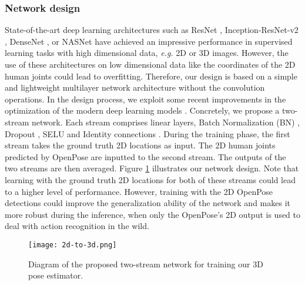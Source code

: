 \documentclass{bmvc2k}
\begin{document}
\subsubsection{Network design}
State-of-the-art deep learning architectures such as ResNet \cite{7780459}, Inception-ResNet-v2 \cite{Szegedy2016Inceptionv4IA}, DenseNet \cite{Huang2017DenselyCC}, or NASNet \cite{Zoph2017NeuralAS} have achieved an impressive performance in supervised learning tasks with high dimensional data, \textit{e.g.} 2D or 3D images. However, the use of these architectures \cite{7780459,Szegedy2016Inceptionv4IA,Huang2017DenselyCC,Zoph2017NeuralAS} on low dimensional data like the coordinates of the 2D human joints could lead to overfitting. Therefore, our design is based on a simple and lightweight multilayer network architecture without the convolution operations. In the design process, we exploit some recent improvements in the optimization of the modern deep learning models \cite{7780459,Huang2017DenselyCC}. Concretely, we propose a two-stream network. Each stream comprises linear layers, Batch Normalization (BN) \cite{Ioffe2015BatchNA}, Dropout \cite{Hinton2012ImprovingNN}, SELU \cite{Klambauer2017SelfNormalizingNN} and Identity connections \cite{7780459}. During the training phase, the first stream takes the  ground truth 2D locations as input. The 2D human joints predicted by OpenPose \cite{cao2017realtime} are inputted to the second stream. The outputs of the two streams are then averaged. Figure \ref{fig:2} illustrates our network design. Note that learning with the ground truth 2D locations for both of these streams could lead to a higher level of performance. However, training with the 2D OpenPose detections could improve the generalization ability of the network and makes it more robust during the inference, when only the OpenPose's 2D output is used to deal with action recognition in the wild.
\begin{figure}[h]
\begin{center}
 \texttt{[image: 2d-to-3d.png]} 
 \vspace*{-0.4cm}
\end{center}
   \caption{Diagram of the proposed two-stream network for training our 3D pose estimator.}
\label{fig:2}
\end{figure}\\[-1cm]
\end{document}
